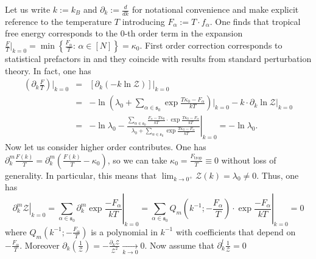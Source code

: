 \documentclass[11pt,british,reqno]{article}
\numberwithin{equation}{section}
\numberwithin{figure}{section}
\numberwithin{table}{section}
\theoremstyle{definition}
\theoremstyle{definition}
\theoremstyle{plain}
\theoremstyle{plain}
\theoremstyle{remark}
\theoremstyle{plain}
\numberwithin{equation}{section}
\numberwithin{figure}{section}
\numberwithin{table}{section}
\theoremstyle{plain}
\begin{document}
Let us write $k:=k_{B}$ and $\displaystyle \partial_{k}:=\frac{d}{dk}$ for notational convenience and make explicit reference to the temperature $T$ introducing $\displaystyle F_{\alpha}:=T\cdot f_{\alpha}$.
One finds that tropical free energy corresponds to the $0$-th order
term in the expansion ${\displaystyle \frac{F}{T}\Big|_{k=0}=\min\left\{ \frac{F_{\alpha}}{T}:\,\alpha\in[N]\right\} =\kappa_{0}}$.
First order correction corresponds to statistical prefactors in \cite{AK2015}
and they coincide with results from standard perturbation theory.
In fact, one has 
\begin{eqnarray}
\left(\partial_{k}\frac{F}{T}\right)\Big|_{k=0} & = & \left[\partial_{k}(-k\ln\mathcal{Z})\right]|_{k=0}\nonumber \\
& = & -\ln\left(\lambda_{0}+{\displaystyle \sum_{\alpha\in\mathfrak{s}_{0}}\exp}{\displaystyle \frac{T\kappa_{0}-F_{\alpha}}{kT}}\right)\Big|_{k=0}-k\cdot\partial_{k}\ln\mathcal{Z}|_{k=0} \nonumber \\
& = & -\ln\lambda_{0}-\left.\frac{\sum_{\alpha\in\mathfrak{s}_{0}}\frac{F_{\alpha}-T\kappa_{0}}{kT}\cdot\exp\frac{T\kappa_{0}-F_{\alpha}}{kT}}{\lambda_{0}+\sum_{\alpha\in\mathfrak{s}_{0}}\exp\frac{T\kappa_{0}-F_{\alpha}}{kT}}\right|_{k=0}=-\ln\lambda_{0}.\label{eq: first order correction tropical} 
\end{eqnarray}
Now let us consider higher order contributes. One has ${\displaystyle \partial_{k}^{m}\frac{F(k)}{T}=\partial_{k}^{m}\left(\frac{F(k)}{T}-\kappa_{0}\right)}$,
so we can take ${\displaystyle \kappa_{0}=\frac{F_{\mathrm{trop}}}{T}\equiv0}$
without loss of generality. In particular, this means that ${\displaystyle \lim_{k\rightarrow0^{+}}\mathcal{Z}(k)=\lambda_{0}\neq0}$.
Thus, one has 
\begin{equation}
\left.\partial_{k}^{m}\mathcal{Z}\right|_{k=0}=\left.\sum_{\alpha\in\mathfrak{s}_{0}}\partial_{k}^{m}\exp\frac{-F_{\alpha}}{kT}\right|_{k=0}=\left.\sum_{\alpha\in\mathfrak{s}_{0}}Q_{m}\left(k^{-1};-\frac{F_{\alpha}}{T}\right)\cdot\exp{\displaystyle \frac{-F_{\alpha}}{kT}}\right|_{k=0}=0\label{eq: perturbation Z m-order}
\end{equation}
where ${\displaystyle Q_{m}\left(k^{-1};-\frac{F_{\alpha}}{T}\right)}$
is a polynomial in $k^{-1}$ with coefficients that depend on $-{\displaystyle \frac{F_{\alpha}}{T}}$.
Moreover ${\displaystyle \partial_{k}\left(\frac{1}{\mathcal{Z}}\right)=-\frac{\partial_{k}\mathcal{Z}}{\mathcal{Z}^{2}}\underset{{\scriptstyle k\rightarrow0}}{\longrightarrow}0}$.
Now assume that $\partial_{k}^{l}{\displaystyle \frac{1}{\mathcal{Z}}=0}$
\end{document}
